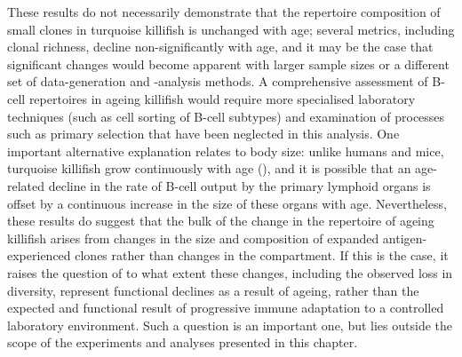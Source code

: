 These results do not necessarily demonstrate that the repertoire composition of small clones in turquoise killifish is unchanged with age; several metrics, including clonal richness, decline non-significantly with age, and it may be the case that significant changes would become apparent with larger sample sizes or a different set of data-generation and -analysis methods. A comprehensive assessment of \naive B-cell repertoires in ageing killifish would require more specialised laboratory techniques (such as cell sorting of B-cell subtypes) and examination of processes such as primary selection that have been neglected in this analysis. One important alternative explanation relates to body size: unlike humans and mice, turquoise killifish grow continuously with age (), and it is possible that an age-related decline in the rate of B-cell output by the primary lymphoid organs is offset by a continuous increase in the size of these organs with age. Nevertheless, these results do suggest that the bulk of the change in the  repertoire of ageing killifish arises from changes in the size and composition of expanded antigen-experienced clones rather than changes in the \naive compartment. If this is the case, it raises the question of to what extent these changes, including the observed loss in diversity, represent functional declines as a result of ageing, rather than the expected and functional result of progressive immune adaptation to a controlled laboratory environment. Such a question is an important one, but lies outside the scope of the experiments and analyses presented in this chapter.



